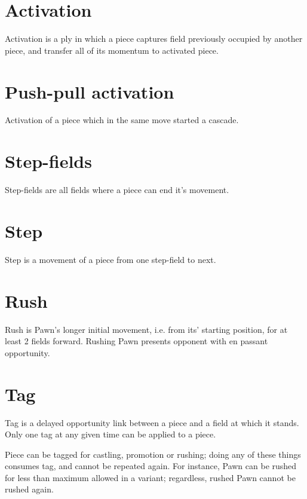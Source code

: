 \section*{Activation}
\label{sec:Terms/Activation}
Activation is a ply in which a piece captures field previously occupied by another piece,
and transfer all of its momentum to activated piece.

\section*{Push-pull activation}
\label{sec:Terms/Push-pull activation}
Activation of a piece which in the same move started a cascade.

\section*{Step-fields}
\label{sec:Terms/Step-fields}
Step-fields are all fields where a piece can end it's movement.

\section*{Step}
\label{sec:Terms/Step}
Step is a movement of a piece from one step-field to next.

\section*{Rush}
\label{sec:Terms/Rush}
Rush is Pawn's longer initial movement, i.e. from its’ starting position, for at least 2 fields forward.
Rushing Pawn presents opponent with en passant opportunity.

\section*{Tag}
\label{sec:Terms/Tag}
Tag is a delayed opportunity link between a piece and a field at which it stands.
Only one tag at any given time can be applied to a piece.

Piece can be tagged for castling, promotion or rushing; doing any of these things consumes tag, and cannot be repeated again.
For instance, Pawn can be rushed for less than maximum allowed in a variant; regardless, rushed Pawn cannot be rushed again.

